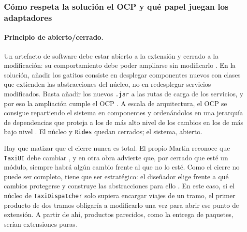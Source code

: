 \subsubsection{Cómo respeta la solución el OCP y qué papel juegan los adaptadores}

\paragraph{Principio de abierto/cerrado.} Un artefacto de software debe estar abierto a la extensión
y cerrado a la modificación: su comportamiento debe poder ampliarse sin modificarlo
\parencite[p.~70]{martin2017clean}. En la solución, añadir los gatitos consiste en desplegar
componentes nuevos con clases que extienden las abstracciones del núcleo, no en redesplegar servicios
modificados. Basta añadir los nuevos \texttt{.jar} a las rutas de carga de los servicios, y por eso
la ampliación cumple el OCP \parencite[p.~246]{martin2017clean}. A escala de arquitectura, el OCP se
consigue repartiendo el sistema en componentes y ordenándolos en una jerarquía de dependencias que
proteja a los de más alto nivel de los cambios en los de más bajo nivel
\parencite[p.~75]{martin2017clean}. El núcleo y \texttt{Rides} quedan cerrados; el sistema, abierto.

Hay que matizar que el cierre nunca es total. El propio Martin reconoce que \texttt{TaxiUI} debe
cambiar \parencite[p.~244]{martin2017clean}, y en otra obra advierte que, por cerrado que esté un
módulo, siempre habrá algún cambio frente al que no lo esté. Como el cierre no puede ser completo,
tiene que ser estratégico: el diseñador elige frente a qué cambios protegerse y construye las
abstracciones para ello \parencite[p.~105]{martin2014agile}. En este caso, si el núcleo de
\texttt{TaxiDispatcher} solo supiera encargar viajes de un tramo, el primer producto de dos tramos
obligaría a modificarlo una vez para abrir ese punto de extensión. A partir de ahí, productos
parecidos, como la entrega de paquetes, serían extensiones puras.

